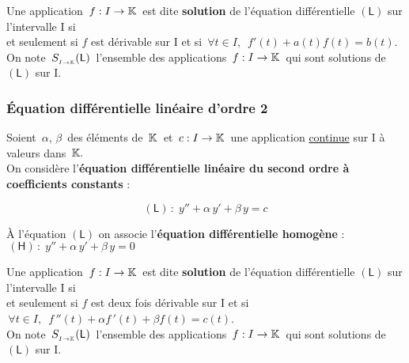 Une application \(\,f:I\to \mathbb{K}\,\) est dite \textbf{solution} de l'équation différentielle $\left(\mathsf{L} \right)$ sur l'intervalle I si\vspace{0.1cm}\\
et seulement si $f$ est dérivable sur I et si \(\, \forall t \in I,\ \;f'(t)+a(t)f(t)=b(t)\).\vspace{0.3cm}\\
On note \(\,S_{_{I\to\mathbb{K}}}(\mathsf{L})\,\) l'ensemble des applications \(\,f:I\to \mathbb{K}\,\) qui sont solutions de $\left(\mathsf{L}\right)$ sur I.


\vspace{1cm}

\subsubsection[EDL d'ordre 2]{Équation différentielle linéaire d'ordre 2}

\vspace{1cm}

Soient \(\,\alpha,\, \beta\,\) des éléments de \(\,\mathbb{K}\,\) et \(\,c:I\to\mathbb{K}\,\) une application \underline{continue} sur I à valeurs dans \(\,\mathbb{K}.\)\vspace{0.2cm}\\
On considère l'\textbf{équation différentielle linéaire du second ordre à coefficients constants} :\vspace{-0.3cm}

\[(\mathsf{L})\,:\;y''+\alpha\,y'+\beta\,y=c\]

\vspace{0.3cm}

À l'équation $\left(\mathsf{L}\right)$ on associe l'\textbf{équation différentielle homogène} : \(\,(\mathsf{H})\,:\; y''+\alpha\,y'+\beta\,y=0\)

\vspace{1.2cm}

Une application \(\,f:I\to \mathbb{K}\,\) est dite \textbf{solution} de l'équation différentielle $\left(\mathsf{L} \right)$ sur l'intervalle I si\vspace{0.1cm}\\
et seulement si $f$ est deux fois dérivable sur I et si \(\, \forall t \in I,\ \;f\,''(t)+\alpha f\,'(t)+\beta f(t)=c(t)\).\vspace{0.3cm}\\
On note \(\,S_{_{I\to\mathbb{K}}}(\mathsf{L})\,\) l'ensemble des applications \(\,f:I\to \mathbb{K}\,\) qui sont solutions de $\left(\mathsf{L}\right)$ sur I.

\vspace{2cm}
